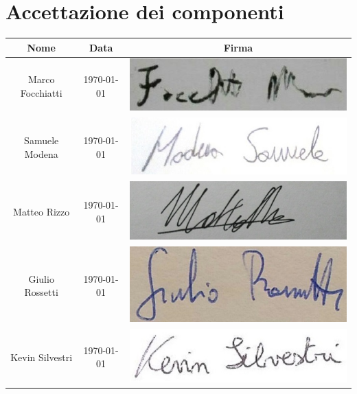 \documentclass[./PianodiProgetto.tex]{subfiles}
\begin{document}
\section{Accettazione dei componenti}
\begin{table}[H]
	\centering
	\begin{tabular}{|c|c|c|}
		\hline
		Nome&Data&Firma \\ \hline
		Marco Focchiatti& \today &\includegraphics[scale=0.5]{img/firme/FocchiattiMarco} \\ \hline
		Samuele Modena& \today &\includegraphics[scale=0.5]{img/firme/ModenaSamuele} \\ \hline
		Matteo Rizzo& \today &\includegraphics[scale=0.5]{img/firme/RizzoMatteo} \\ \hline
		Giulio Rossetti&  \today &\includegraphics[scale=0.5]{img/firme/RossettiGiulio} \\ \hline
		Kevin Silvestri& \today &\includegraphics[scale=0.5]{img/firme/SilvestriKevin} \\ \hline

\end{tabular}
\end{table}
\end{document}
